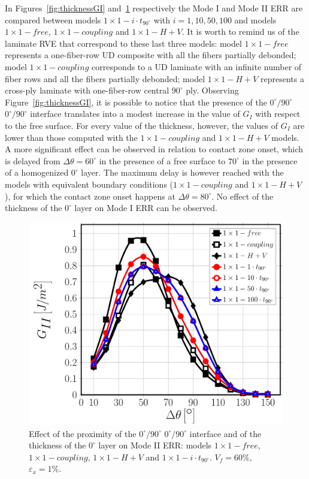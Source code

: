 \documentclass[review]{elsarticle}
\begin{document}
In Figures~\ref{fig:thicknessGI} and~\ref{fig:thicknessGII} respectively the Mode I and Mode II ERR are compared between models $1\times 1-i\cdot t_{90^{\circ}}$ with $i=1,10,50,100$ and models $1\times 1-free$, $1\times 1-coupling$ and $1\times 1-H+V$. It is worth to remind us of the laminate RVE that correspond to these last three models: model $1\times 1-free$ represents a one-fiber-row UD composite with all the fibers partially debonded; model $1\times 1-coupling$ corresponds to a UD laminate with an infinite number of fiber rows and all the fibers partially debonded; model $1\times 1-H+V$ represents a cross-ply laminate with one-fiber-row central $90^{\circ}$ ply. Observing Figure~\ref{fig:thicknessGI}, it is possible to notice that the presence of the $0^{\circ}/90^{\circ}$ $0^{\circ}/90^{\circ}$ interface translates into a modest increase in the value of $G_{I}$ with respect to the free surface. For every value of the thickness, however, the values of $G_{I}$ are lower than those computed with the $1\times 1-coupling$ and $1\times 1-H+V$ models. A more significant effect can be observed in relation to contact zone onset, which is delayed from $\Delta\theta=60^{\circ}$ in the presence of a free surface to $70^{\circ}$ in the presence of a homogenized $0^{\circ}$ layer. The maximum delay is however reached with the models with equivalent boundary conditions ($1\times 1-coupling$ and $1\times 1-H+V$), for which the contact zone onset happens at $\Delta\theta=80^{\circ}$. No effect of the thickness of the $0^{\circ}$ layer on Mode I ERR can be observed.

\begin{figure}[!h]
\centering
\includegraphics[width=\textwidth]{1x1-i-vf60-GII.pdf}
\caption{Effect of the proximity of the $0^{\circ}/90^{\circ}$ $0^{\circ}/90^{\circ}$ interface and of the thickness of the $0^{\circ}$ layer on Mode II ERR: models $1\times 1-free$, $1\times 1-coupling$, $1\times 1-H+V$ and $1\times 1-i\cdot t_{90^{\circ}}$. $V_{f}=60\%$, $\varepsilon_{x}=1\%$.}\label{fig:thicknessGII}
\end{figure}
\end{document}
